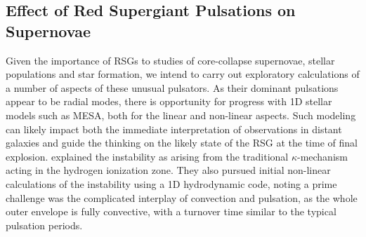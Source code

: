 \subsection{Effect of Red Supergiant Pulsations on Supernovae}

Given the importance of RSGs to studies of core-collapse supernovae, stellar populations and star formation, we intend to carry out exploratory calculations of a number of aspects of these unusual pulsators. As their dominant pulsations appear to be radial modes, there is opportunity for progress with 1D stellar models such as MESA, both for the linear and non-linear aspects. {\color{green} Such modeling can likely impact both the immediate interpretation of observations in distant galaxies and guide the thinking on the likely state of the RSG at the time of final explosion.} \citet{1997AampA...327..224H}  explained the instability  as arising from the traditional $\kappa$-mechanism acting in the hydrogen ionization zone. 
They also pursued initial
non-linear calculations of the instability using a 1D hydrodynamic code, noting a prime challenge was the complicated interplay of convection and pulsation, as the whole outer envelope is fully convective, with a turnover time similar to the typical pulsation periods.